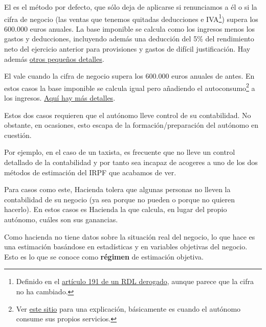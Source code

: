 \documentclass[nochap,palatino,shortheader]{apuntes}
\begin{document}
El  es el método por defecto, que sólo deja de aplicarse si renunciamos a él o si la cifra de negocio (las ventas que tenemos quitadas deducciones e IVA\footnote{Definido en el \href{http://www.boe.es/buscar/doc.php?id=BOE-A-1989-30361}{artículo 191 de un RDL derogado}, aunque parece que la cifra no ha cambiado.}) supera los 600.000 euros anuales. La base imponible se calcula como los ingresos menos los gastos y deducciones, incluyendo además una deducción del 5\% del rendimiento neto del ejercicio anterior para provisiones y gastos de difícil justificación. Hay además \href{http://portal.circe.es/es-ES/emprendedor/EmpresarioIndividual/TributacionAutonomos/Paginas/AutonomoEstimacionDirectaSimplificada.aspx}{otros pequeños detalles}.

El  vale cuando la cifra de negocio supera los 600.000 euros anuales de antes. En estos casos la base imponible se calcula igual pero añadiendo el autoconsumo\footnote{Ver \href{http://www.pymesyautonomos.com/fiscalidad-y-contabilidad/el-autoconsumo-de-bienes-y-servicios-tratamiento-fiscal-y-contable}{este sitio} para una explicación, básicamente es cuando el autónomo consume sus propios servicios.} a los ingresos. \href{http://portal.circe.es/es-ES/emprendedor/EmpresarioIndividual/TributacionAutonomos/Paginas/autonomoestimacionDirectaNormal.aspx}{Aquí hay más detalles}.

Estos dos casos requieren que el autónomo lleve control de su contabilidad. No obstante, en ocasiones, esto escapa de la formación/preparación del autónomo en cuestión.

Por ejemplo, en el caso de un taxista, es frecuente que no lleve un control detallado de la contabilidad y por tanto sea incapaz de acogeres a uno de los dos métodos de estimación del IRPF que acabamos de ver.

Para casos como este, Hacienda tolera que algunas personas no lleven la contabilidad de su negocio (ya sea porque no pueden o porque no quieren hacerlo). En estos casos es Hacienda la que calcula, en lugar del propio autónomo, cuáles son sus ganancias.

Como hacienda no tiene datos sobre la situación real del negocio, lo que hace es una estimación basándose en estadísticas y en variables objetivas del negocio. Esto es lo que se conoce como \textbf{régimen} de estimación objetiva.
\end{document}
